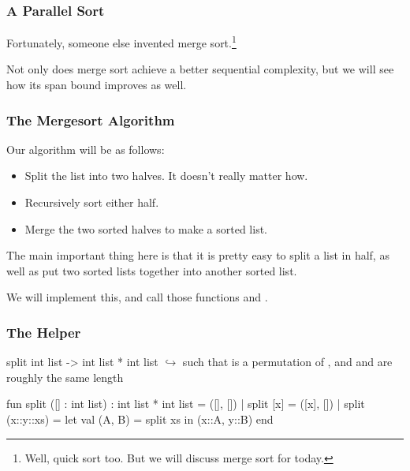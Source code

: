 \documentclass[aspectratio=169]{beamer}
\begin{document}
\begin{frame}[fragile]
  \frametitle{A Parallel Sort}

  Fortunately, someone else invented merge sort.\footnote{
    Well, quick sort too. But we will discuss merge sort for today.
  }

  \pause
  \vspace{\fill}


  \pause
  \vspace{\fill}

  Not only does merge sort achieve a better sequential complexity, but we will
  see how its span bound improves as well.
\end{frame}

\begin{frame}[fragile]
  \frametitle{The Mergesort Algorithm}

  Our algorithm will be as follows:

  \pause
  \begin{itemize}
    \item Split the list into two halves. It doesn't really matter how. \pause
    \item Recursively sort either half. \pause
    \item Merge the two sorted halves to make a sorted list.
  \end{itemize}

  \pause
  \vspace{\fill}

  The main important thing here is that it is pretty easy to split a list in
  half, as well as put two sorted lists together into another sorted list.

  \pause
  \vspace{\fill}

  We will implement this, and call those functions  and .
\end{frame}

\begin{frame}[fragile]
  \frametitle{The  Helper}

  \spec
    {split}
    {int list -> int list * int list}
    {}
    { $\hookrightarrow$  such that  is a
    permutation of , and  and  are roughly the
    same length}

  \pause
  \vspace{\fill}

  \begin{codeblock}
    fun split ([] : int list) : int list * int list = ([], [])
      | split [x] = ([x], [])
      | split (x::y::xs) =
          let
            val (A, B) = split xs
          in
            (x::A, y::B)
          end
  \end{codeblock}
\end{frame}
\end{document}
